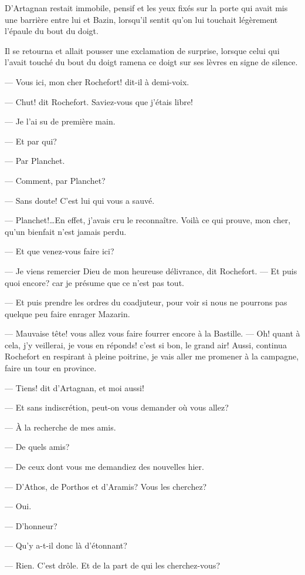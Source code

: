 D'Artagnan restait immobile, pensif et les yeux fixés sur la porte qui avait mis une barrière entre lui et Bazin, lorsqu'il sentit qu'on lui touchait légèrement l'épaule du bout du doigt.

Il se retourna et allait pousser une exclamation de surprise, lorsque celui qui l'avait touché du bout du doigt ramena ce doigt sur ses lèvres en signe de silence.

— Vous ici, mon cher Rochefort! dit-il à demi-voix.

— Chut! dit Rochefort. Saviez-vous que j'étais libre!

— Je l'ai su de première main.

— Et par qui?

— Par Planchet.

— Comment, par Planchet?

— Sans doute! C'est lui qui vous a sauvé.

— Planchet!\dots En effet, j'avais cru le reconnaître. Voilà ce qui prouve, mon cher, qu'un bienfait n'est jamais perdu.

— Et que venez-vous faire ici?

— Je viens remercier Dieu de mon heureuse délivrance, dit Rochefort.
— Et puis quoi encore? car je présume que ce n'est pas tout.

— Et puis prendre les ordres du coadjuteur, pour voir si nous ne pourrons pas quelque peu faire enrager Mazarin.

— Mauvaise tête! vous allez vous faire fourrer encore à la Bastille.
— Oh! quant à cela, j'y veillerai, je vous en réponds! c'est si bon, le grand air! Aussi, continua Rochefort en respirant à pleine poitrine, je vais aller me promener à la campagne, faire un tour en province.

— Tiens! dit d'Artagnan, et moi aussi!

— Et sans indiscrétion, peut-on vous demander où vous allez?

— À la recherche de mes amis.

— De quels amis?

— De ceux dont vous me demandiez des nouvelles hier.

— D'Athos, de Porthos et d'Aramis? Vous les cherchez?

— Oui.

— D'honneur?

— Qu'y a-t-il donc là d'étonnant?

— Rien. C'est drôle. Et de la part de qui les cherchez-vous?

